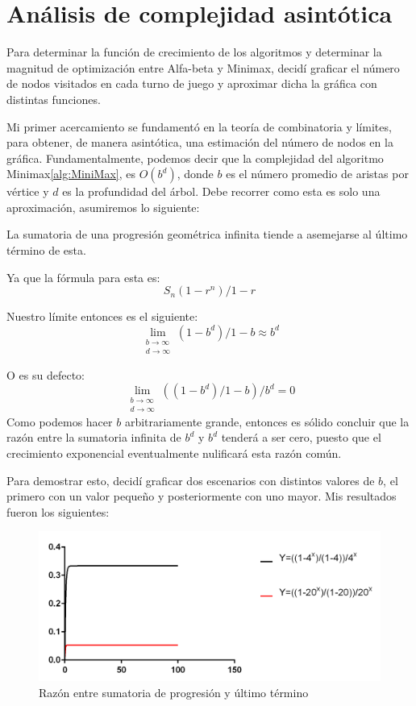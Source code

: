\section{Análisis de complejidad asintótica}
Para determinar la función de crecimiento de los algoritmos y determinar la magnitud de optimización entre Alfa-beta y Minimax, decidí graficar el número de nodos visitados en cada turno de juego y aproximar dicha la gráfica con distintas funciones. 

Mi primer acercamiento se fundamentó en la teoría de combinatoria y límites, para obtener, de manera asintótica, una estimación del número de nodos en la gráfica. Fundamentalmente, podemos decir que la complejidad del algoritmo Minimax\ref{alg:MiniMax}, es $O(b^{d})$, donde $b$ es el número promedio de aristas por vértice y $d$ es la profundidad del árbol. Debe recorrer  como esta es solo una  aproximación, asumiremos lo siguiente: 

La sumatoria de una progresión geométrica infinita tiende a asemejarse al último término de esta. 

Ya que la fórmula para esta es:
\begin{equation}
S_{n}(1-r^{n})/1-r
\end{equation}

Nuestro límite entonces es el siguiente: 
\begin{equation}
\lim_{\substack{b\to \infty \\ d\to \infty}} (1-b^{d})/1-b \approx b^{d}
\end{equation}



O es su defecto:
\begin{equation}
\lim_{\substack{b\to \infty \\ d\to \infty}} ((1-b^{d})/1-b)/b^{d} = 0
\end{equation} 
Como podemos hacer $b$ arbitrariamente grande, entonces es sólido concluir que la razón entre la sumatoria infinita de $b^{d}$ y $b^{d}$ tenderá a ser cero, puesto que el crecimiento exponencial eventualmente nulificará esta razón común. 

Para demostrar esto, decidí graficar dos escenarios con distintos valores de $b$, el primero con un valor pequeño y posteriormente con uno mayor. Mis resultados fueron los siguientes: 
\begin{figure}[H]
\centering
\includegraphics[scale=.60]{Graphs/Funciones1.png}
\caption{Razón entre sumatoria de progresión y último término}\label{graf1}
\end{figure}


